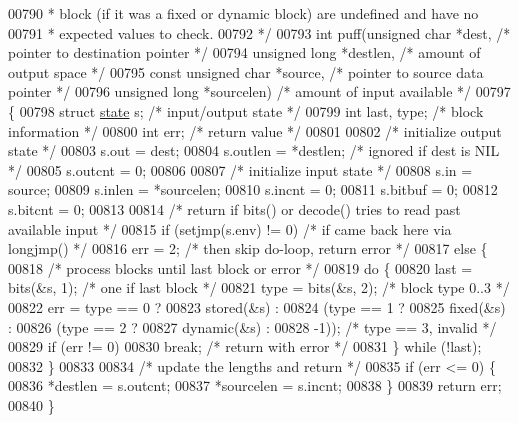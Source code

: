 \begin{DoxyCode}
00790 \textcolor{comment}{ *   block (if it was a fixed or dynamic block) are undefined and have no}
00791 \textcolor{comment}{ *   expected values to check.}
00792 \textcolor{comment}{ */}
00793 \textcolor{keywordtype}{int} puff(\textcolor{keywordtype}{unsigned} \textcolor{keywordtype}{char} *dest,           \textcolor{comment}{/* pointer to destination pointer */}
00794          \textcolor{keywordtype}{unsigned} \textcolor{keywordtype}{long} *destlen,        \textcolor{comment}{/* amount of output space */}
00795          \textcolor{keyword}{const} \textcolor{keywordtype}{unsigned} \textcolor{keywordtype}{char} *source,   \textcolor{comment}{/* pointer to source data pointer */}
00796          \textcolor{keywordtype}{unsigned} \textcolor{keywordtype}{long} *sourcelen)      \textcolor{comment}{/* amount of input available */}
00797 \{
00798     \textcolor{keyword}{struct }\hyperlink{structstate}{state} s;             \textcolor{comment}{/* input/output state */}
00799     \textcolor{keywordtype}{int} last, type;             \textcolor{comment}{/* block information */}
00800     \textcolor{keywordtype}{int} err;                    \textcolor{comment}{/* return value */}
00801 
00802     \textcolor{comment}{/* initialize output state */}
00803     s.out = dest;
00804     s.outlen = *destlen;                \textcolor{comment}{/* ignored if dest is NIL */}
00805     s.outcnt = 0;
00806 
00807     \textcolor{comment}{/* initialize input state */}
00808     s.in = source;
00809     s.inlen = *sourcelen;
00810     s.incnt = 0;
00811     s.bitbuf = 0;
00812     s.bitcnt = 0;
00813 
00814     \textcolor{comment}{/* return if bits() or decode() tries to read past available input */}
00815     \textcolor{keywordflow}{if} (setjmp(s.env) != 0)             \textcolor{comment}{/* if came back here via longjmp() */}
00816         err = 2;                        \textcolor{comment}{/* then skip do-loop, return error */}
00817     \textcolor{keywordflow}{else} \{
00818         \textcolor{comment}{/* process blocks until last block or error */}
00819         \textcolor{keywordflow}{do} \{
00820             last = bits(&s, 1);         \textcolor{comment}{/* one if last block */}
00821             type = bits(&s, 2);         \textcolor{comment}{/* block type 0..3 */}
00822             err = type == 0 ?
00823                     stored(&s) :
00824                     (type == 1 ?
00825                         fixed(&s) :
00826                         (type == 2 ?
00827                             dynamic(&s) :
00828                             -1));       \textcolor{comment}{/* type == 3, invalid */}
00829             \textcolor{keywordflow}{if} (err != 0)
00830                 \textcolor{keywordflow}{break};                  \textcolor{comment}{/* return with error */}
00831         \} \textcolor{keywordflow}{while} (!last);
00832     \}
00833 
00834     \textcolor{comment}{/* update the lengths and return */}
00835     \textcolor{keywordflow}{if} (err <= 0) \{
00836         *destlen = s.outcnt;
00837         *sourcelen = s.incnt;
00838     \}
00839     \textcolor{keywordflow}{return} err;
00840 \}
\end{DoxyCode}
